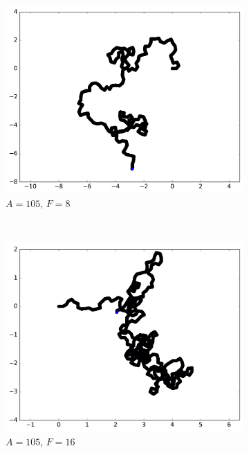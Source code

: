 \begin{appendices}
\begin{figure}[htbp]
		~
		\begin{subfigure}[t]{\subImgWmo}
			\centering
			\includegraphics[width=\textwidth]{figures/ch3/synTraj_219_105_8}
			\caption[$A = 105$, $F=8$]{$A = 105$, $F=8$}
			\label{fig:synTraj_219_105_8}
		\end{subfigure}
		~
		\begin{subfigure}[t]{\subImgWmo}
			\centering
			\includegraphics[width=\textwidth]{figures/ch3/synTraj_219_105_16}
			\caption[$A = 105$, $F=16$]{$A = 105$, $F=16$}
			\label{fig:synTraj_219_105_16}
		\end{subfigure}
		~
		\begin{subfigure}[t]{\subImgWmo}

\end{subfigure}
\end{figure}
\end{appendices}
